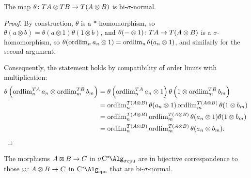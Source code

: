\begin{lemma}\label{lem:theta_bisigma}
	The map $\theta\colon T{A} \otimes T{B} \to T({A}\otimes {B})$ is bi-$\sigma$-normal.
\end{lemma}
\begin{proof}
	By construction, $\theta$ is a $*$-homomorphism, so $\theta(a\otimes b)=\theta(a\otimes 1)\theta(1\otimes b)$, and $\theta(-\otimes 1)\colon T{A} \to T({A}\otimes {B})$ is a $\sigma$-homomorphism, so $\theta(\operatorname{ordlim}_n a_n \otimes 1) = \operatorname{ordlim}_n \theta(a_n \otimes 1)$, and similarly for the second argument.

	Consequently, the statement holds by compatibility of order limits with multiplication:
	\begin{equation*}
		\begin{split}
			\theta\left(\operatorname{ordlim}_n^{T{A}} a_n \otimes \operatorname{ordlim}^{T{B}}_m b_m\right) & =\theta\left(\operatorname{ordlim}^{T{A}}_n a_n \otimes 1\right)\theta\left(1\otimes \operatorname{ordlim}^{T{B}}_m b_m\right)    \\
			                                                               & = \operatorname{ordlim}^{T({A}\otimes {B})}_n \theta(a_n \otimes 1)\operatorname{ordlim}^{T({A}\otimes {B})}_m \theta(1\otimes b_m) \\
			                                                               & = \operatorname{ordlim}^{T({A}\otimes {B})}_n \operatorname{ordlim}^{T({A}\otimes {B})}_m \theta(a_n \otimes 1)\theta(1\otimes b_m) \\
			                                                               & =\operatorname{ordlim}^{T({A}\otimes {B})}_n \operatorname{ordlim}^{T({A}\otimes {B})}_m \theta(a_n \otimes b_m).
		\end{split}
	\end{equation*}
\end{proof}
\begin{proposition}\label{prop:universal_bisigma}
	The morphisms $\A \kocktensor \B \to \C$ in $\SigmaCcpu$ are in bijective correspondence to those $\omega\colon {A} \otimes {B} \to {C}$ in $\Calgcpu$ that are bi-$\sigma$-normal.
\end{proposition}
